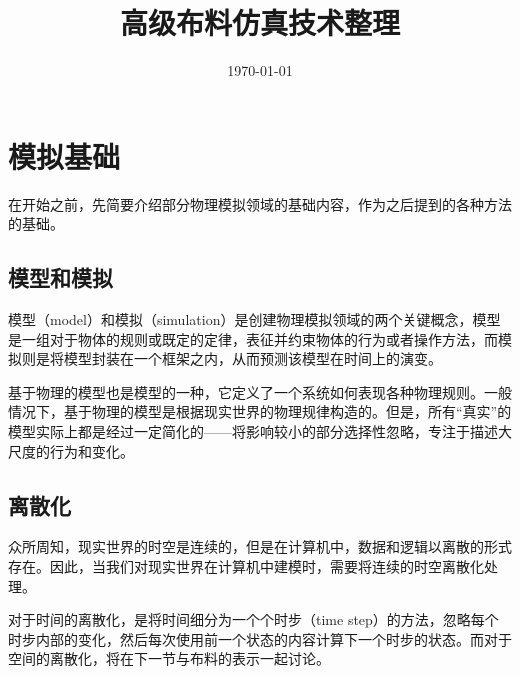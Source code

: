 \documentclass{article}
\title{高级布料仿真技术整理}
\author{}
\date{\today}
\begin{document}
\maketitle
\tableofcontents

\section{模拟基础}
\par 在开始之前，先简要介绍部分物理模拟领域的基础内容，作为之后提到的各种方法的基础。
\subsection{模型和模拟}
\par 模型（model）和模拟（simulation）是创建物理模拟领域的两个关键概念，模型是一组对于物体的规则或既定的定律，表征并约束物体的行为或者操作方法，而模拟则是将模型封装在一个框架之内，从而预测该模型在时间上的演变。\cite{FoPBMA}
\par 基于物理的模型也是模型的一种，它定义了一个系统如何表现各种物理规则。一般情况下，基于物理的模型是根据现实世界的物理规律构造的。但是，所有“真实”的模型实际上都是经过一定简化的——将影响较小的部分选择性忽略，专注于描述大尺度的行为和变化。
\subsection{离散化}
\par 众所周知，现实世界的时空是连续的，但是在计算机中，数据和逻辑以离散的形式存在。因此，当我们对现实世界在计算机中建模时，需要将连续的时空离散化处理。
\par 对于时间的离散化，是将时间细分为一个个时步（time step）的方法，忽略每个时步内部的变化，然后每次使用前一个状态的内容计算下一个时步的状态。而对于空间的离散化，将在下一节与布料的表示一起讨论。
\end{document}
